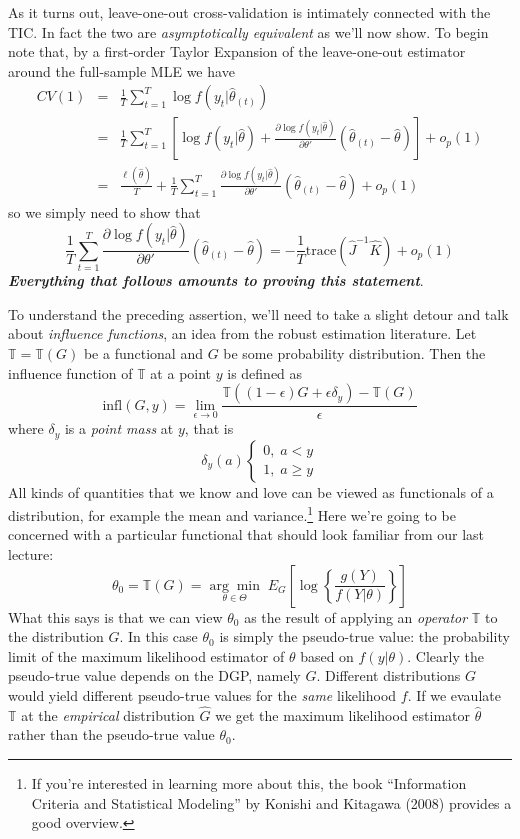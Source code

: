 \documentclass[12pt]{article}
\theoremstyle{definition}
\begin{document}
As it turns out, leave-one-out cross-validation is intimately connected with the TIC. In fact the two are \emph{asymptotically equivalent} as we'll now show. To begin note that, by a first-order Taylor Expansion of the leave-one-out estimator around the full-sample MLE we have
	\begin{eqnarray*}
		CV(1) &=& \frac{1}{T} \sum_{t=1}^T \log f(y_t|\widehat{\theta}_{(t)})\\
			&=&\frac{1}{T} \sum_{t=1}^T \left[\log f(y_t|\widehat{\theta}) + \frac{\partial \log f(y_t|\widehat{\theta})}{\partial \theta'}\left(\widehat{\theta}_{(t)} - \widehat{\theta} \right) \right] + o_p(1)\\
			&=& \frac{\ell(\widehat{\theta})}{T} + \frac{1}{T}\sum_{t=1}^T \frac{\partial \log f(y_t|\widehat{\theta})}{\partial \theta'}\left(\widehat{\theta}_{(t)} - \widehat{\theta} \right) + o_p(1)
	\end{eqnarray*}
so we simply need to show that
	$$\frac{1}{T}\sum_{t=1}^T \frac{\partial \log f(y_t|\widehat{\theta})}{\partial \theta'}\left(\widehat{\theta}_{(t)} - \widehat{\theta} \right) = -\frac{1}{T}\mbox{trace}\left(\widehat{J}^{-1} \widehat{K} \right) + o_p(1)$$
\textbf{\emph{Everything that follows amounts to proving this statement}}. 

To understand the preceding assertion, we'll need to take a slight detour and talk about \emph{influence functions}, an idea from the robust estimation literature. Let $\mathbb{T}=\mathbb{T}(G)$ be a functional and $G$ be some probability distribution. Then the influence function of $\mathbb{T}$ at a point $y$ is defined as 
	$$\mbox{infl}(G,y) = \lim_{\epsilon \rightarrow 0} \frac{\mathbb{T}\left(\left(1-\epsilon\right)G + \epsilon \delta_y\right) - \mathbb{T}(G)}{\epsilon}$$
where $\delta_y$ is a \emph{point mass} at $y$, that is
		$$\delta_y(a)\left\{\begin{array}{c} 0, \; a<y \\ 1, \; a\geq y\end{array} \right.$$
 All kinds of quantities that we know and love can be viewed as functionals of a distribution, for example the mean and variance.\footnote{If you're interested in learning more about this, the book ``Information Criteria and Statistical Modeling'' by Konishi and Kitagawa (2008) provides a good overview.} Here we're going to be concerned with a particular functional that should look familiar from our last lecture:
	$$\theta_0 = \mathbb{T}(G) = \underset{\theta \in \Theta}{\arg \min} \;E_G\left[\log\left\{\frac{g(Y)}{f(Y|\theta)} \right\} \right]$$
What this says is that we can view $\theta_0$ as the result of applying an \emph{operator} $\mathbb{T}$ to the distribution $G$. In this case $\theta_0$ is simply the pseudo-true value: the probability limit of the maximum likelihood estimator of $\theta$ based on $f(y|\theta)$. Clearly the pseudo-true value depends on the DGP, namely $G$. Different distributions $G$ would yield different pseudo-true values for the \emph{same} likelihood $f$. If we evaulate $\mathbb{T}$ at the \emph{empirical} distribution $\widehat{G}$ we get the maximum likelihood estimator $\widehat{\theta}$ rather than the pseudo-true value $\theta_0$.
\end{document}
